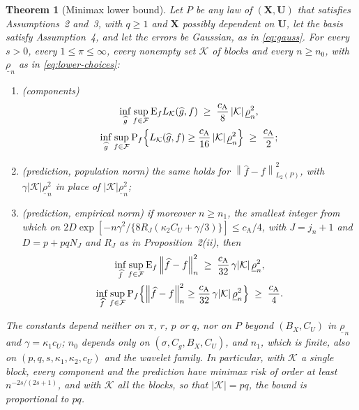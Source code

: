 \documentclass[10pt]{book}
\newtheorem{theorem}{Theorem}[section]
\theoremstyle{definition}
\newcommand{\E}{\mathrm{E}}
\newcommand{\Prob}{\mathrm{P}}
\newcommand{\norm}[1]{\left\lVert #1 \right\rVert}
\newcommand{\normn}[1]{\left\lVert #1 \right\rVert_{n}}
\newcommand{\lev}{j}
\newcommand{\NJ}{N_{J}}
\newcommand{\bX}{\mathbf{X}}
\newcommand{\bU}{\mathbf{U}}
\newcommand{\Kcal}{\mathcal{K}}
\newcommand{\rlow}{\underline{\rho}_{n}}
\newcommand{\cA}{c_{\mathrm{A}}}
\begin{document}
{\begin{theorem}[Minimax lower bound]
\label{thm:lower}
Let $P$ be any law of $(\bX,\bU)$ that satisfies Assumptions~2 and~3, with
$q \ge 1$ and $\bX$ possibly dependent on $\bU$, let the basis satisfy
Assumption~4, and let the errors be Gaussian, as in \eqref{eq:gauss}. For
every $s > 0$, every $1 \le \pi \le \infty$, every nonempty set $\Kcal$ of
blocks and every $n \ge n_{0}$, with $\rlow$ as in \eqref{eq:lower-choices}:
\begin{enumerate}
\item[(i)] (components)
\begin{gather*}
  \inf_{\widehat{g}}\sup_{f\in\mathcal{F}}\E_{f}L_{\Kcal}(\widehat{g},f)
  \;\ge\; \frac{\cA}{8}\,|\Kcal|\,\rlow^{2},
  \\
  \inf_{\widehat{g}}\sup_{f\in\mathcal{F}}\Prob_{f}\Bigl\{L_{\Kcal}(\widehat{g},f)
  \ge \frac{\cA}{16}\,|\Kcal|\,\rlow^{2}\Bigr\} \;\ge\; \frac{\cA}{2} ;
\end{gather*}
\item[(ii)] (prediction, population norm) the same holds for
$\norm{\widehat{f}-f}_{L_2(P)}^{2}$, with $\gamma|\Kcal|\rlow^{2}$ in place of
$|\Kcal|\rlow^{2}$;
\item[(iii)] (prediction, empirical norm) if moreover $n \ge n_{1}$, the
smallest integer from which on
$2D\exp[-n\gamma^{2}/\{8R_{J}(\kappa_2C_U + \gamma/3)\}] \le \cA/4$, with
$J = \lev_n + 1$ and $D = p + pq\NJ$ and $R_J$ as in Proposition~2(ii), then
\begin{gather*}
  \inf_{\widehat{f}}\sup_{f\in\mathcal{F}}\E_{f}\normn{\widehat{f}-f}^{2}
  \;\ge\; \frac{\cA}{32}\,\gamma|\Kcal|\,\rlow^{2},
  \\
  \inf_{\widehat{f}}\sup_{f\in\mathcal{F}}\Prob_{f}\Bigl\{\normn{\widehat{f}-f}^{2}
  \ge \frac{\cA}{32}\,\gamma|\Kcal|\,\rlow^{2}\Bigr\} \;\ge\; \frac{\cA}{4} .
\end{gather*}
\end{enumerate}
The constants depend neither on $\pi$, $r$, $p$ or $q$, nor on $P$ beyond
$(B_X,C_U)$ in $\rlow$ and $\gamma = \kappa_1c_U$; $n_{0}$ depends only on
$(\sigma,C_g,B_X,C_U)$, and $n_{1}$, which is finite, also on
$(p,q,s,\kappa_1,\kappa_2,c_U)$ and the wavelet family. In particular, with
$\Kcal$ a single block, every component and the prediction have minimax risk
of order at least $n^{-2s/(2s+1)}$, and with $\Kcal$ all the blocks, so that
$|\Kcal| = pq$, the bound is proportional to $pq$.
\end{theorem}

}
\end{document}
